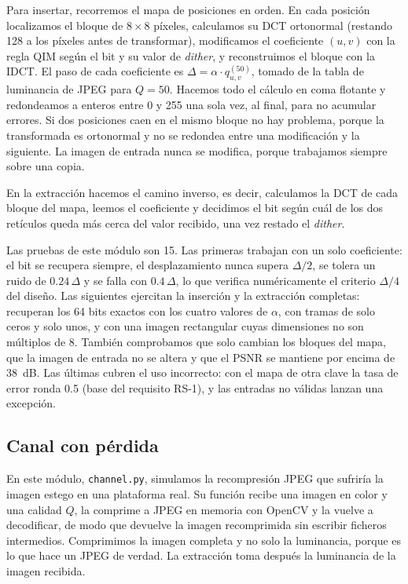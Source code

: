 \documentclass[IB]{TFUOC}%
\begin{document}
Para insertar, recorremos el mapa de posiciones en orden. En cada posición localizamos el 
bloque de $8 \times 8$ píxeles, calculamos su DCT ortonormal (restando 128 a los píxeles antes de 
transformar), modificamos el coeficiente $(u,v)$ con la regla QIM según el bit y su 
valor de \textit{dither}, y reconstruimos el bloque con la IDCT. El paso de cada coeficiente 
es $\Delta = \alpha \cdot q^{(50)}_{u,v}$, tomado de la tabla de luminancia de JPEG 
para $Q=50$. Hacemos todo el cálculo en coma flotante y redondeamos a enteros entre 0 y 
255 una sola vez, al final, para no acumular errores. Si dos posiciones caen en el mismo bloque 
no hay problema, porque la transformada es ortonormal y no se redondea entre una modificación y 
la siguiente. La imagen de entrada nunca se modifica, porque trabajamos siempre sobre una copia.

En la extracción hacemos el camino inverso, es decir, calculamos la DCT de cada bloque del mapa, 
leemos el coeficiente y decidimos el bit según cuál de los dos retículos queda más cerca del valor 
recibido, una vez restado el \textit{dither}.

Las pruebas de este módulo son 15. Las primeras trabajan con un solo coeficiente: el bit se recupera 
siempre, el desplazamiento nunca supera $\Delta/2$, se tolera un ruido de $0{.}24\,\Delta$ y se 
falla con $0{.}4\,\Delta$, lo que verifica numéricamente el criterio $\Delta/4$ del diseño. Las 
siguientes ejercitan la inserción y la extracción completas: recuperan los 64 bits exactos con 
los cuatro valores de $\alpha$, con tramas de solo ceros y solo unos, y con una imagen rectangular 
cuyas dimensiones no son múltiplos de 8. También comprobamos que solo cambian los bloques del mapa, 
que la imagen de entrada no se altera y que el PSNR se mantiene por encima de 38~dB. Las últimas 
cubren el uso incorrecto: con el mapa de otra clave la tasa de error ronda 0{.}5 (base del 
requisito RS-1), y las entradas no válidas lanzan una excepción.

\subsection{Canal con pérdida}
\label{subsec:impl_channel}

En este módulo, \texttt{channel.py}, simulamos la recompresión JPEG que sufriría la imagen estego en una plataforma 
real. Su función recibe una imagen en color y una calidad $Q$, la comprime a JPEG en memoria con 
OpenCV y la vuelve a decodificar, de modo que devuelve la imagen recomprimida sin escribir 
ficheros intermedios. Comprimimos la imagen completa y no solo la luminancia, porque es lo que 
hace un JPEG de verdad. La extracción toma después la luminancia de la imagen recibida.
\end{document}
